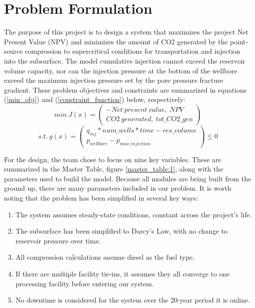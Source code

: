 \documentclass[balance,upint,subscriptcorrection,varvw,mathalfa=cal=boondoxo,spanish,french,vietnamese,russian,greek,pdf-a,colorlinks]{asmeconf}
\begin{document}
\section{Problem Formulation}
The purpose of this project is to design a system that maximizes the project Net Present Value (NPV) and minimizes the amount of CO2 generated by the point-source compression to supercritical conditions for transportation and injection into the subsurface. The model cumulative injection cannot exceed the reservoir volume capacity, nor can the injection pressure at the bottom of the wellbore exceed the maximum injection pressure set by the pore pressure fracture gradient. These problem objectives and constraints are summarized in equations (\ref{min_obj}) and (\ref{constraint_function}) below, respectively:
\begin{equation} \label{min_obj}
  min\ J(x) = 
  \begin{pmatrix}
      -Net\ present\ value,\ NPV \\
      CO2\ generated,\ tot\_CO2\_gen
  \end{pmatrix}
\end{equation}
\begin{equation} \label{constraint_function}
  s.t.\ g(x) = 
  \begin{pmatrix}
      q_{inj} * num\_wells * time-res\_volume \\
      p_{wellbore} - p_{max\_injection}
  \end{pmatrix}
  \leq 0
\end{equation}

For the design, the team chose to focus on nine key variables. These are summarized in the Master Table, figure \ref{master_table:1}, along with the parameters used to build the model. Because all modules are being built from the ground up, there are many parameters included in our problem. It is worth noting that the problem has been simplified in several key ways:
\begin{enumerate}
  \item The system assumes steady-state conditions, constant across the project's life.
  \item The subsurface has been simplified to Darcy's Law, with no change to reservoir pressure over time.
  \item All compression calculations assume diesel as the fuel type.
  \item If there are multiple facility tie-ins, it assumes they all converge to one processing facility before entering our system.
  \item No downtime is considered for the system over the 20-year period it is online.
\end{enumerate}
\end{document}
